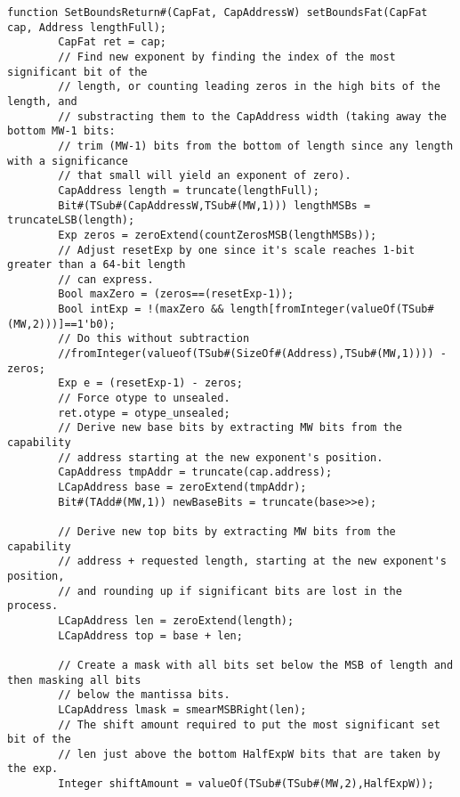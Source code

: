 \begin{lstlisting}[language=bluespec]
function SetBoundsReturn#(CapFat, CapAddressW) setBoundsFat(CapFat cap, Address lengthFull);
        CapFat ret = cap;
        // Find new exponent by finding the index of the most significant bit of the
        // length, or counting leading zeros in the high bits of the length, and
        // substracting them to the CapAddress width (taking away the bottom MW-1 bits:
        // trim (MW-1) bits from the bottom of length since any length with a significance
        // that small will yield an exponent of zero).
        CapAddress length = truncate(lengthFull);
        Bit#(TSub#(CapAddressW,TSub#(MW,1))) lengthMSBs = truncateLSB(length);
        Exp zeros = zeroExtend(countZerosMSB(lengthMSBs));
        // Adjust resetExp by one since it's scale reaches 1-bit greater than a 64-bit length
        // can express.
        Bool maxZero = (zeros==(resetExp-1));
        Bool intExp = !(maxZero && length[fromInteger(valueOf(TSub#(MW,2)))]==1'b0);
        // Do this without subtraction
        //fromInteger(valueof(TSub#(SizeOf#(Address),TSub#(MW,1)))) - zeros;
        Exp e = (resetExp-1) - zeros;
        // Force otype to unsealed.
        ret.otype = otype_unsealed;
        // Derive new base bits by extracting MW bits from the capability
        // address starting at the new exponent's position.
        CapAddress tmpAddr = truncate(cap.address);
        LCapAddress base = zeroExtend(tmpAddr);
        Bit#(TAdd#(MW,1)) newBaseBits = truncate(base>>e);

        // Derive new top bits by extracting MW bits from the capability
        // address + requested length, starting at the new exponent's position,
        // and rounding up if significant bits are lost in the process.
        LCapAddress len = zeroExtend(length);
        LCapAddress top = base + len;

        // Create a mask with all bits set below the MSB of length and then masking all bits
        // below the mantissa bits.
        LCapAddress lmask = smearMSBRight(len);
        // The shift amount required to put the most significant set bit of the
        // len just above the bottom HalfExpW bits that are taken by the exp.
        Integer shiftAmount = valueOf(TSub#(TSub#(MW,2),HalfExpW));


\end{lstlisting}
